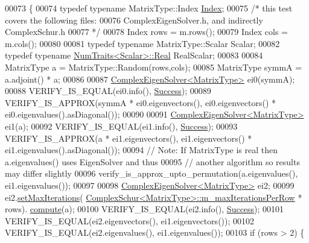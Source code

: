 \begin{DoxyCode}
00073 \{
00074   \textcolor{keyword}{typedef} \textcolor{keyword}{typename} MatrixType::Index \hyperlink{namespace_eigen_a62e77e0933482dafde8fe197d9a2cfde}{Index};
00075   \textcolor{comment}{/* this test covers the following files:}
00076 \textcolor{comment}{     ComplexEigenSolver.h, and indirectly ComplexSchur.h}
00077 \textcolor{comment}{  */}
00078   Index rows = m.rows();
00079   Index cols = m.cols();
00080 
00081   \textcolor{keyword}{typedef} \textcolor{keyword}{typename} MatrixType::Scalar Scalar;
00082   \textcolor{keyword}{typedef} \textcolor{keyword}{typename} \hyperlink{group___core___module_struct_eigen_1_1_num_traits}{NumTraits<Scalar>::Real} RealScalar;
00083 
00084   MatrixType a = MatrixType::Random(rows,cols);
00085   MatrixType symmA =  a.adjoint() * a;
00086 
00087   \hyperlink{group___eigenvalues___module_class_eigen_1_1_complex_eigen_solver}{ComplexEigenSolver<MatrixType>} ei0(symmA);
00088   VERIFY\_IS\_EQUAL(ei0.info(), \hyperlink{group__enums_gga85fad7b87587764e5cf6b513a9e0ee5ea52581b035f4b59c203b8ff999ef5fcea}{Success});
00089   VERIFY\_IS\_APPROX(symmA * ei0.eigenvectors(), ei0.eigenvectors() * ei0.eigenvalues().asDiagonal());
00090 
00091   \hyperlink{group___eigenvalues___module_class_eigen_1_1_complex_eigen_solver}{ComplexEigenSolver<MatrixType>} ei1(a);
00092   VERIFY\_IS\_EQUAL(ei1.info(), \hyperlink{group__enums_gga85fad7b87587764e5cf6b513a9e0ee5ea52581b035f4b59c203b8ff999ef5fcea}{Success});
00093   VERIFY\_IS\_APPROX(a * ei1.eigenvectors(), ei1.eigenvectors() * ei1.eigenvalues().asDiagonal());
00094   \textcolor{comment}{// Note: If MatrixType is real then a.eigenvalues() uses EigenSolver and thus}
00095   \textcolor{comment}{// another algorithm so results may differ slightly}
00096   verify\_is\_approx\_upto\_permutation(a.eigenvalues(), ei1.eigenvalues());
00097 
00098   \hyperlink{group___eigenvalues___module_class_eigen_1_1_complex_eigen_solver}{ComplexEigenSolver<MatrixType>} ei2;
00099   ei2.\hyperlink{group___eigenvalues___module_a0c5a974da17774d75be41e351e6bda62}{setMaxIterations}(
      \hyperlink{group___eigenvalues___module_class_eigen_1_1_complex_schur}{ComplexSchur<MatrixType>::m\_maxIterationsPerRow} * rows).
      \hyperlink{group___eigenvalues___module_aeb7e38c6db5369f5c974f3786e94c1f0}{compute}(a);
00100   VERIFY\_IS\_EQUAL(ei2.info(), \hyperlink{group__enums_gga85fad7b87587764e5cf6b513a9e0ee5ea52581b035f4b59c203b8ff999ef5fcea}{Success});
00101   VERIFY\_IS\_EQUAL(ei2.eigenvectors(), ei1.eigenvectors());
00102   VERIFY\_IS\_EQUAL(ei2.eigenvalues(), ei1.eigenvalues());
00103   \textcolor{keywordflow}{if} (rows > 2) \{

\end{DoxyCode}
